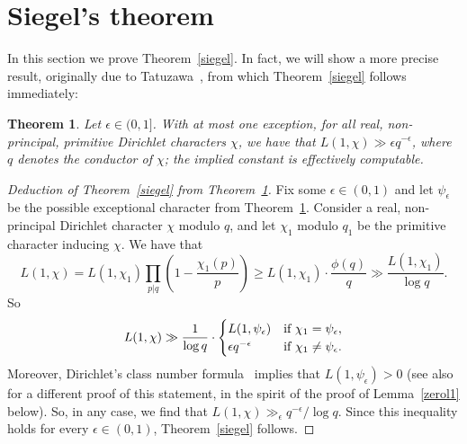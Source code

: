 \documentclass[12pt]{amsart}
\newtheorem{theorem}{Theorem}[section]
\theoremstyle{remark}
\numberwithin{equation}{section}
\begin{document}




\section{Siegel's theorem}\label{siegelproof}

In this section we prove Theorem~\ref{siegel}. In fact, we will show a more precise result, originally due to Tatuzawa~\cite{Ta}, from which Theorem~\ref{siegel} follows immediately:

\begin{theorem}\label{siegel2} Let $\epsilon\in(0,1]$. With at most one exception, for all real, non-principal, primitive Dirichlet characters $\chi$, we have that $L(1,\chi)\gg\epsilon q^{-\epsilon}$, where $q$ denotes the conductor of $\chi$; the implied constant is effectively computable.
\end{theorem}

\begin{proof}[Deduction of Theorem~\ref{siegel} from Theorem~\ref{siegel2}] Fix some $\epsilon\in(0,1)$ and let $\psi_\epsilon$ be the possible exceptional character from Theorem~\ref{siegel2}.
Consider a real, non-principal Dirichlet character $\chi$ modulo $q$, and let $\chi_1$ modulo $q_1$ be the primitive character inducing $\chi$. We have that
$$
L(1,\chi)=L(1,\chi_1)\prod_{p|q}\left(1-\frac{\chi_1(p)}p\right)\ge L(1,\chi_1) \cdot \frac{\phi(q)}q \gg\frac{L(1,\chi_1)}{\log q}.
$$
So
$$
L(1,\chi)\gg\frac1{\log q}\cdot
\begin{cases}L(1,\psi_\epsilon) &\text{if}\ \chi_1=\psi_\epsilon,\cr
\epsilon q^{-\epsilon} &\text{if}\ \chi_1\neq\psi_\epsilon.
\end{cases}
$$
Moreover, Dirichlet's class number formula~\cite[p. 49-50]{Dav} implies that $L(1,\psi_\epsilon)>0$ (see also~\cite[p. 37]{ik} for a different proof of this statement, in the spirit of the proof of Lemma~\ref{zerol1} below). So, in any case, we find that $L(1,\chi)\gg_\epsilon q^{-\epsilon}/\log q$. Since this inequality holds for every $\epsilon\in(0,1)$, Theorem~\ref{siegel} follows.
\end{proof}
\end{document}
